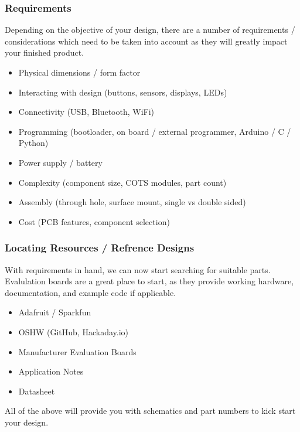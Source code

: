 \documentclass[aspectratio=169, t]{beamer}
\begin{document}
\begin{frame}
\frametitle{Requirements}
Depending on the objective of your design, there are a number of requirements / considerations which need to be taken into account as they will greatly impact your finished product. \\[10pt]

\begin{itemize}
	\item Physical dimensions / form factor
	\item Interacting with design (buttons, sensors, displays, LEDs)
	\item Connectivity (USB, Bluetooth, WiFi)
	\item Programming (bootloader, on board / external programmer, Arduino / C / Python)
	\item Power supply / battery
	\item Complexity (component size, COTS modules, part count)
	\item Assembly (through hole, surface mount, single vs double sided)
	\item Cost (PCB features, component selection)
\end{itemize}
\end{frame}

\begin{frame}
\frametitle{Locating Resources / Refrence Designs}
With requirements in hand, we can now start searching for suitable parts.\\
Evalulation boards are a great place to start, as they provide working hardware, documentation, and example code if applicable.\\[10pt]

\begin{itemize}
	\item Adafruit / Sparkfun
	\item OSHW (GitHub, Hackaday.io)
	\item Manufacturer Evaluation Boards
	\item Application Notes
	\item Datasheet
\end{itemize}
\vspace{10pt}
All of the above will provide you with schematics and part numbers to kick start your design.
\end{frame}
\end{document}
